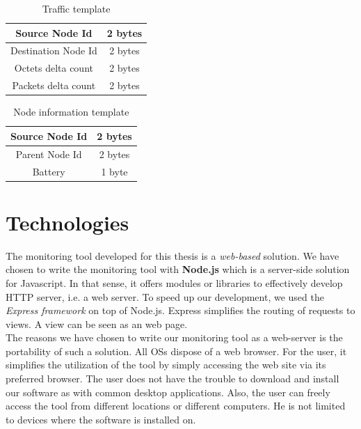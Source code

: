 \begin{table}
  \centering
  \begin{tabular}{|c|c|}
    \hline
    Source Node Id & 2 bytes \\
    \hline
    Destination Node Id & 2 bytes \\
    \hline
    Octets delta count & 2 bytes \\
    \hline
    Packets delta count & 2 bytes \\
    \hline
  \end{tabular}
  \caption{Traffic template}
  \label{table:traffic_template}
\end{table}

\begin{table}
  \centering
  \begin{tabular}{|c|c|}
    \hline
    Source Node Id & 2 bytes \\
    \hline
    Parent Node Id & 2 bytes \\
    \hline
    Battery & 1 byte \\
    \hline
  \end{tabular}
  \caption{Node information template}
  \label{table:node_template}
\end{table}


\section{Technologies}

The monitoring tool developed for this thesis is a \textit{web-based} solution. We have chosen to write the monitoring tool with \textbf{Node.js} \cite{website:nodejs} which is a server-side solution for Javascript. In that sense, it offers modules or libraries to effectively develop HTTP server, i.e. a web server. To speed up our development, we used the \textit{Express framework} \cite{website:express} on top of Node.js. Express simplifies the routing of requests to views. A view can be seen as an web page. \\

The reasons we have chosen to write our monitoring tool as a web-server is the portability of such a solution. All OSs dispose of a web browser. For the user, it simplifies the utilization of the tool by simply accessing the web site via its preferred browser. The user does not have the trouble to download and install our software as with common desktop applications. Also, the user can freely access the tool from different locations or different computers. He is not limited to devices where the software is installed on. \\

